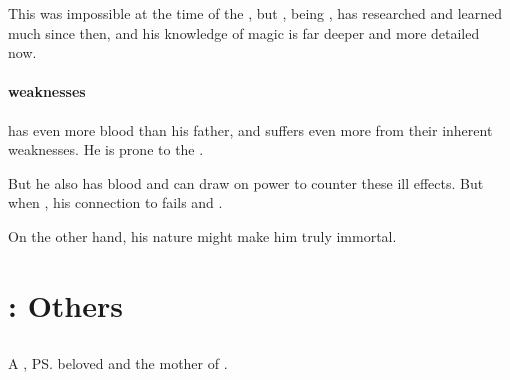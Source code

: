 This was impossible at the time of the \SecondShrouding{}, but \Secherdamon, being , has researched and learned much since then, and his knowledge of magic is far deeper and more detailed now.





\subsubsection{\XzaiShannic{} weaknesses}
\Vizsherioch{} has even more \xsic{} blood than his father, and suffers even more from their inherent weaknesses. 
He is prone to the . 

But he also has \bane{} blood and can draw on \Erebean{} power to counter these ill effects. But when , his connection to \Erebos{} fails and . 

On the other hand, his \xsic{} nature might make him truly immortal. 























\chapter{\Dragons: Others}
















\section{\AeocrithRystessakhin}
\index{\Rystessakhin}
\index{\AeocrithRystessakhin}
A \dragon, \ps{\Ishnaruchaefir} beloved and the mother of \Nzessuacrith. 

